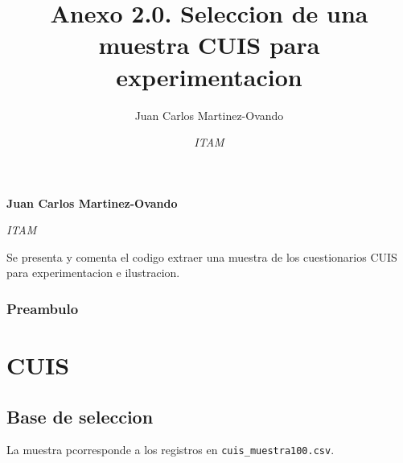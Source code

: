 \documentclass[11pt,]{article}
\title{Anexo 2.0. Seleccion de una muestra CUIS para experimentacion  }
\author{\Large Juan Carlos Martinez-Ovando\vspace{0.05in} \newline\normalsize\emph{}   \and \Large \vspace{0.05in} \newline\normalsize\emph{ITAM}  }
\date{}
\newcommand*{\authorfont}{\fontfamily{phv}\selectfont}
\renewenvironment{abstract}
 {{%
    \setlength{\leftmargin}{0mm}
    \setlength{\rightmargin}{\leftmargin}%
  }%
  \relax}
 {\endlist}
\begin{document}
	
%

{%
\setlength{\parindent}{0pt}
\thispagestyle{plain}
{\fontsize{18}{20}\selectfont\raggedright 
\maketitle  %

}

{
   \vskip 13.5pt\relax \normalsize\fontsize{11}{12} 
\textbf{\authorfont Juan Carlos Martinez-Ovando} \hskip 15pt \emph{\small }   \par \textbf{\authorfont } \hskip 15pt \emph{\small ITAM}   

}

}








\begin{abstract}

    \hbox{\vrule height .2pt width 39.14pc}

    \vskip 8.5pt %

\noindent Se presenta y comenta el codigo extraer una muestra de los cuestionarios
CUIS para experimentacion e ilustracion.


    \hbox{\vrule height .2pt width 39.14pc}


\end{abstract}


\vskip 6.5pt


\noindent  \subsubsection{Preambulo}\label{preambulo}

\section{CUIS}\label{cuis}

\subsection{Base de seleccion}\label{base-de-seleccion}

La muestra pcorresponde a los registros en
\texttt{cuis\_muestra100.csv}.
\end{document}
